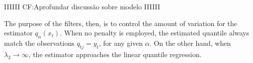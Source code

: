 IIIIII
CF:Aprofundar discussão sobre modelo
IIIIII

The purpose of the filters, then, is to control the amount of variation for the estimator $q_\alpha(x_t)$. When no penalty is employed, the estimated quantile always match the observations $q_{tj} = y_t$, for any given $\alpha$. On the other hand, when $\lambda_2 \rightarrow \infty$, the estimator approaches the linear quantile regression. 






